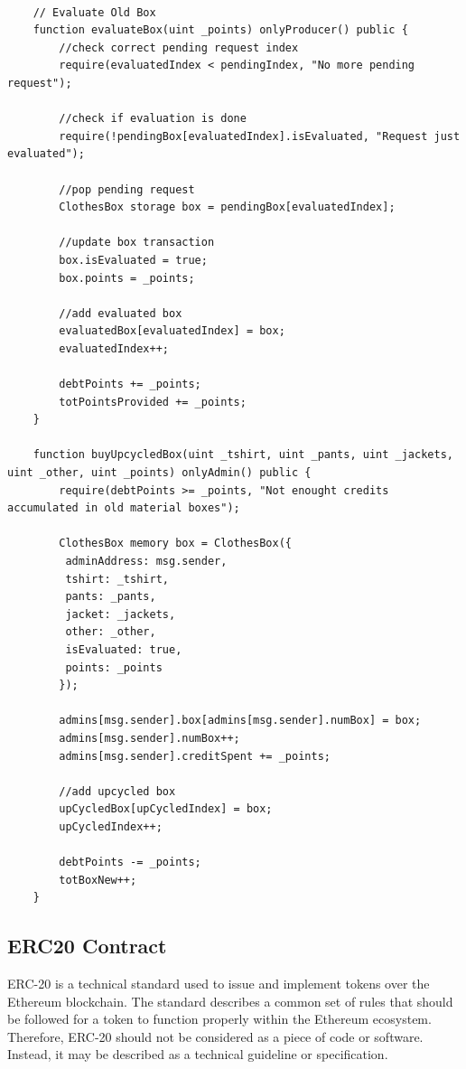 \begin{lstlisting}[language=Solidity]
    
    // Evaluate Old Box
    function evaluateBox(uint _points) onlyProducer() public {
        //check correct pending request index
        require(evaluatedIndex < pendingIndex, "No more pending request");

        //check if evaluation is done
        require(!pendingBox[evaluatedIndex].isEvaluated, "Request just evaluated");

        //pop pending request
        ClothesBox storage box = pendingBox[evaluatedIndex];

        //update box transaction
        box.isEvaluated = true;
        box.points = _points;

        //add evaluated box
        evaluatedBox[evaluatedIndex] = box;
        evaluatedIndex++;

        debtPoints += _points;
        totPointsProvided += _points;
    }

    function buyUpcycledBox(uint _tshirt, uint _pants, uint _jackets, uint _other, uint _points) onlyAdmin() public {
        require(debtPoints >= _points, "Not enought credits accumulated in old material boxes");

        ClothesBox memory box = ClothesBox({
         adminAddress: msg.sender,
         tshirt: _tshirt,
         pants: _pants,
         jacket: _jackets,
         other: _other,
         isEvaluated: true,
         points: _points
        });

        admins[msg.sender].box[admins[msg.sender].numBox] = box;
        admins[msg.sender].numBox++;
        admins[msg.sender].creditSpent += _points;

        //add upcycled box
        upCycledBox[upCycledIndex] = box;
        upCycledIndex++;

        debtPoints -= _points;
        totBoxNew++;
    }

\end{lstlisting}

\subsection{ERC20 Contract}
\label{erc20}

ERC-20 is a technical standard used to issue and implement tokens over the Ethereum blockchain.
The standard describes a common set of rules that should be followed for a token to function properly
within the Ethereum ecosystem. Therefore, ERC-20 should not be considered as a piece of code or 
software. Instead, it may be described as a technical guideline or specification.
\bigskip

